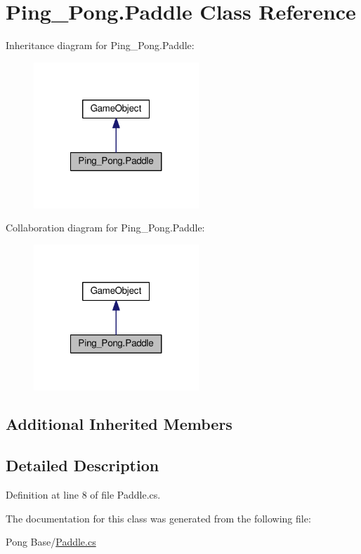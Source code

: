 \hypertarget{class_ping___pong_1_1_paddle}{\section{Ping\-\_\-\-Pong.\-Paddle Class Reference}
\label{class_ping___pong_1_1_paddle}
}


Inheritance diagram for Ping\-\_\-\-Pong.\-Paddle\-:\nopagebreak
\begin{figure}[H]
\begin{center}
\leavevmode
\includegraphics[width=176pt]{class_ping___pong_1_1_paddle__inherit__graph}
\end{center}
\end{figure}


Collaboration diagram for Ping\-\_\-\-Pong.\-Paddle\-:\nopagebreak
\begin{figure}[H]
\begin{center}
\leavevmode
\includegraphics[width=176pt]{class_ping___pong_1_1_paddle__coll__graph}
\end{center}
\end{figure}
\subsection*{Additional Inherited Members}


\subsection{Detailed Description}


Definition at line 8 of file Paddle.\-cs.



The documentation for this class was generated from the following file\-:\begin{DoxyCompactItemize}
\item 
Pong Base/\hyperlink{_paddle_8cs}{Paddle.\-cs}\end{DoxyCompactItemize}
